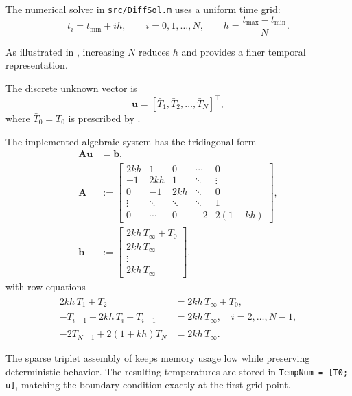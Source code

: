 The numerical solver in \texttt{src/DiffSol.m} uses a uniform time grid:
\begin{equation}
t_i = t_{\min} + i h, \qquad i=0,1,\ldots,N, \qquad
h = \frac{t_{\max}-t_{\min}}{N}.
\label{eq:time-grid}
\end{equation}

As illustrated in , increasing $N$ reduces
$h$ and provides a finer temporal representation.

The discrete unknown vector is
\begin{equation}
\mathbf{u} = [\bar{T}_1,\bar{T}_2,\ldots,\bar{T}_N]^\top,
\label{eq:discrete-unknown}
\end{equation}
where $\bar{T}_0=T_0$ is prescribed by .

The implemented algebraic system has the tridiagonal form
\begin{subequations}\label{eq:linear-system-set}
\begin{align}
\mathbf{A}\mathbf{u} &= \mathbf{b}, \label{eq:linear-system} \\
\mathbf{A} &:= \begin{bmatrix}
2kh & 1 & 0 & \cdots & 0 \\
-1 & 2kh & 1 & \ddots & \vdots \\
0 & -1 & 2kh & \ddots & 0 \\
\vdots & \ddots & \ddots & \ddots & 1 \\
0 & \cdots & 0 & -2 & 2(1+kh)
\end{bmatrix}, \label{eq:matrix-A} \\
\mathbf{b} &:= \begin{bmatrix}
2kh\,T_{\infty}+T_0 \\
2kh\,T_{\infty} \\
\vdots \\
2kh\,T_{\infty}
\end{bmatrix}. \label{eq:vector-b}
\end{align}
\end{subequations}
with row equations
\begin{align}
2kh\,\bar{T}_1 + \bar{T}_2 &= 2kh\,T_{\infty}+T_0, \label{eq:first-row} \\
-\bar{T}_{i-1}+2kh\,\bar{T}_i+\bar{T}_{i+1} &= 2kh\,T_{\infty}, \quad i=2,\ldots,N-1, \label{eq:interior-row} \\
-2\bar{T}_{N-1}+2(1+kh)\bar{T}_N &= 2kh\,T_{\infty}. \label{eq:last-row}
\end{align}

The sparse triplet assembly of  keeps memory usage
low while preserving deterministic behavior. The resulting temperatures are
stored in \texttt{TempNum = [T0; u]}, matching the boundary condition exactly
at the first grid point.
